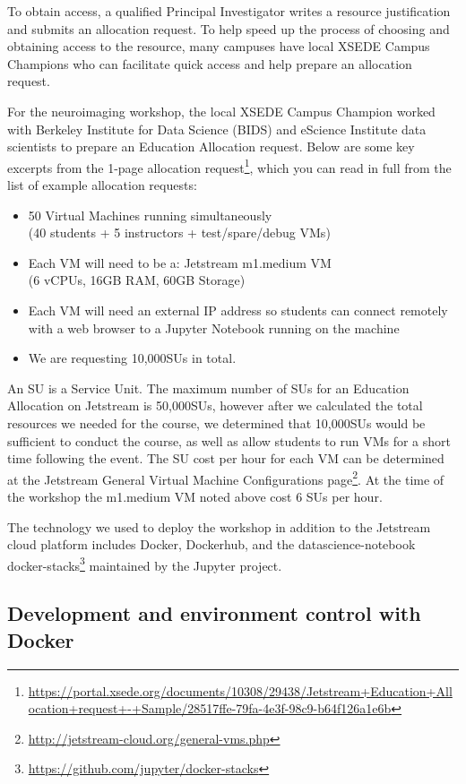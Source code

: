 To obtain access, a qualified Principal Investigator writes a resource
justification and submits an allocation request. To help speed up the
process of choosing and obtaining access to the resource, many campuses
have local XSEDE Campus Champions who can facilitate quick access and
help prepare an allocation request.

For the neuroimaging workshop, the local XSEDE Campus Champion worked with Berkeley
Institute for Data Science (BIDS) and eScience Institute data scientists to
prepare an Education Allocation request. Below are some key excerpts from the
1-page allocation request\footnote{\url{https://portal.xsede.org/documents/10308/29438/Jetstream+Education+Allocation+request+-+Sample/28517ffe-79fa-4e3f-98c9-b64f126a1e6b}},
which you can read in full from the list of example allocation requests:

\begin{itemize}
\item 50 Virtual Machines running simultaneously \\(40 students + 5 instructors +
test/spare/debug VMs)
\item Each VM will need to be a: Jetstream m1.medium VM \\(6 vCPUs, 16GB RAM, 60GB
  Storage)
\item Each VM will need an external IP address so students can connect remotely
  with a web browser to a Jupyter Notebook running on the machine
\item We are requesting 10,000SUs in total.
\end{itemize}

An SU is a Service Unit. The maximum number of SUs for an Education Allocation
on Jetstream is 50,000SUs, however after we calculated the total resources we
needed for the course, we determined that 10,000SUs would be sufficient to
conduct the course, as well as allow students to run VMs for a short time
following the event. The SU cost per hour for each VM can be determined at the
Jetstream General Virtual Machine Configurations page\footnote{\url{http://jetstream-cloud.org/general-vms.php}}.
At the time of the workshop the m1.medium VM noted above cost 6 SUs per hour.

The technology we used to deploy the workshop in addition to the Jetstream cloud
platform includes Docker, Dockerhub, and the datascience-notebook docker-stacks\footnote{\url{https://github.com/jupyter/docker-stacks}}
maintained by the Jupyter project.

\subsection{Development and environment control with Docker}


